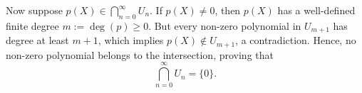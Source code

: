 \begin{exercisesolution}
\begin{enumerate}[label=\textbf{(\alph*)}]
    Now suppose $p(X) \in \bigcap_{n=0}^\infty U_n$. If $p(X) \neq 0$, then $p(X)$ has a well-defined finite degree $m := \deg(p) \ge 0$. But every non-zero polynomial in $U_{m+1}$ has degree at least $m + 1$, which implies $p(X) \notin U_{m+1}$, a contradiction. Hence, no non-zero polynomial belongs to the intersection, proving that
    \[
        \bigcap_{n=0}^\infty U_n = \{0\}.
    \]
\end{enumerate}
\end{exercisesolution}
